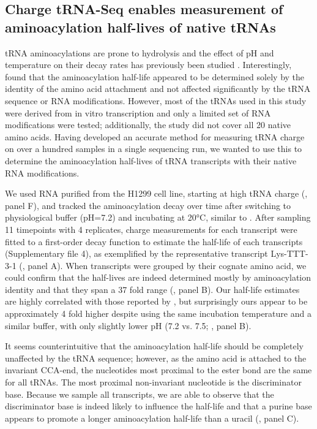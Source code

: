 \documentclass[9pt,lineno]{elife}
\begin{document}
\subsection{Charge tRNA-Seq enables measurement of aminoacylation half-lives of native tRNAs}
tRNA aminoacylations are prone to hydrolysis and the effect of pH and temperature on their decay rates has previously been studied \citep{Hentzen1972-yd}.
Interestingly, \cite{Peacock2014-wk} found that the aminoacylation half-life appeared to be determined solely by the identity of the amino acid attachment and not affected significantly by the tRNA sequence or RNA modifications.
However, most of the tRNAs used in this study were derived from in vitro transcription and only a limited set of RNA modifications were tested; additionally, the study did not cover all 20 native amino acids.
Having developed an accurate method for measuring tRNA charge on over a hundred samples in a single sequencing run, we wanted to use this to determine the aminoacylation half-lives of tRNA transcripts with their native RNA modifications.

We used RNA purified from the H1299 cell line, starting at high tRNA charge (, panel F), and tracked the aminoacylation decay over time after switching to physiological buffer (pH=7.2) and incubating at 20°C, similar to \cite{Peacock2014-wk}.
After sampling 11 timepoints with 4 replicates, charge measurements for each transcript were fitted to a first-order decay function to estimate the half-life of each transcripts (Supplementary file 4), as exemplified by the representative transcript Lys-TTT-3-1 (, panel A).
When transcripts were grouped by their cognate amino acid, we could confirm that the half-lives are indeed determined mostly by aminoacylation identity and that they span a 37 fold range (, panel B).
Our half-life estimates are highly correlated with those reported by \cite{Peacock2014-wk}, but surprisingly ours appear to be approximately 4 fold higher despite using the same incubation temperature and a similar buffer, with only slightly lower pH (7.2 vs. 7.5; , panel B).

It seems counterintuitive that the aminoacylation half-life should be completely unaffected by the tRNA sequence; however, as the amino acid is attached to the invariant CCA-end, the nucleotides most proximal to the ester bond are the same for all tRNAs.
The most proximal non-invariant nucleotide is the discriminator base.
Because we sample all transcripts, we are able to observe that the discriminator base is indeed likely to influence the half-life and that a purine base appears to promote a longer aminoacylation half-life than a uracil (, panel C).
\end{document}
